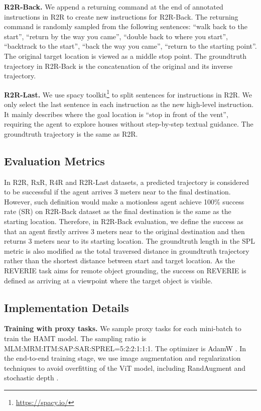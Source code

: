 \noindent\textbf{R2R-Back.} We append a returning command at the end of annotated instructions in R2R to create new instructions for R2R-Back. The returning command is randomly sampled from the following sentences: ``walk back to the start'', ``return by the way you came'', ``double back to where you start'', ``backtrack to the start'', ``back the way you came'', ``return to the starting point''. The original target location is viewed as a middle stop point. The groundtruth trajectory in R2R-Back is the concatenation of the original and its inverse trajectory.

\noindent\textbf{R2R-Last.} We use spacy toolkit\footnote{\url{https://spacy.io/}} to split sentences for instructions in R2R. We only select the last sentence in each instruction as the new high-level instruction. It mainly describes where the goal location is \eg ``stop in front of the vent'', requiring the agent to explore houses without step-by-step textual guidance. The groundtruth trajectory is the same as R2R.

\subsection{Evaluation Metrics}
In R2R, RxR, R4R and R2R-Last datasets, a predicted trajectory is considered to be successful if the agent arrives 3 meters near to the final destination.
However, such definition would make a motionless agent achieve 100\% success rate (SR) on R2R-Back dataset as the final destination is the same as the starting location.
Therefore, in R2R-Back evaluation, we define the success as that an agent firstly arrives 3 meters near to the original destination and then returns 3 meters near to its starting location.
The groundtruth length in the SPL metric is also modified as the total traversed distance in groundtruth trajectory rather than the shortest distance between start and target location. 
As the REVERIE task aims for remote object grounding, the success on REVERIE is defined as arriving at a viewpoint where the target object is visible.

\subsection{Implementation Details}

\noindent\textbf{Training with proxy tasks.}
We sample proxy tasks for each mini-batch to train the HAMT model. The sampling ratio is MLM:MRM:ITM:SAP:SAR:SPREL=5:2:2:1:1:1.
The optimizer is AdamW \cite{loshchilov2017decoupled}.
In the end-to-end training stage, we use image augmentation and regularization techniques to avoid overfitting of the ViT model, including RandAugment \cite{cubuk2020randaugment} and stochastic depth \cite{huang2016deep}.

